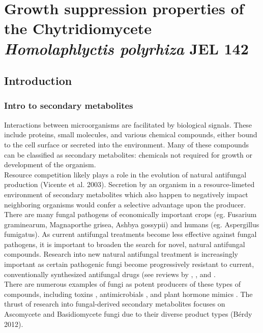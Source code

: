 ﻿%
\chapter{Growth suppression properties of the Chytridiomycete \textit{Homolaphlyctis polyrhiza} JEL 142}
\label{chap:Hp_inhibition}
\section{Introduction}
\subsection{Intro to secondary metabolites}
Interactions between microorganisms are facilitated by biological signals. These include proteins, small molecules, and various chemical compounds, either bound to the cell surface or secreted into the environment. Many of these compounds can be classified as secondary metabolites: chemicals not required for growth or development of the organism. \\
\indent Resource competition likely plays a role in the evolution of natural antifungal production (Vicente et al. 2003). Secretion by an organism in a resource-limeted environment of secondary metabolites which also happen to negatively impact neighboring organisms would confer a selective advantage upon the producer.\\
\indent There are many fungal pathogens of economically important crops (eg. Fusarium graminearum, Magnaporthe grisea, Ashbya gossypii) and humans (eg. Aspergillus fumigatus). As current antifungal treatments become less effective against fungal pathogens, it is important to broaden the search for novel, natural antifungal compounds. Research into new natural antifungal treatment is increasingly important as certain pathogenic fungi become progressively resistant to current, conventionally synthesized antifungal drugs (see reviews by \cite{Bossche1998}, \cite{Kontoyiannis2002}, and \cite{Pfaller2012}. \\
\indent There are numerous examples of fungi as potent producers of these types of compounds, including toxins \cite{Kokkonen2010}, antimicrobials \cite{Wiemann2014}, and plant hormone mimics \cite{Howlett2006}. The thrust of research into fungal-derived secondary metabolites focuses on Ascomycete and Basidiomycete fungi due to their diverse product types (Bérdy 2012). \\
